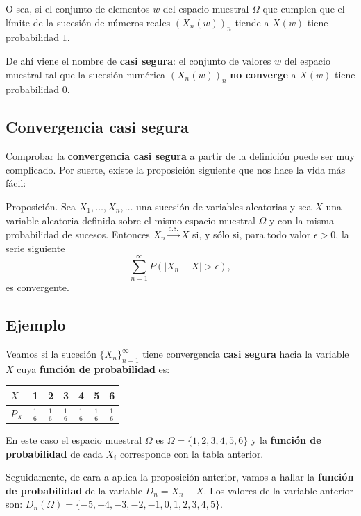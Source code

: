 \documentclass[]{book}
\begin{document}
O sea, si el conjunto de elementos \(w\) del espacio muestral \(\Omega\) que cumplen que el límite de la sucesión de números reales \((X_n(w))_n\) tiende a \(X(w)\) tiene probabilidad \(1\).

De ahí viene el nombre de \textbf{casi segura}: el conjunto de valores \(w\) del espacio muestral tal que la sucesión numérica \((X_n(w))_n\) \textbf{no converge} a \(X(w)\) tiene probabilidad 0.

\hypertarget{convergencia-casi-segura-2}{%
\subsection{Convergencia casi segura}\label{convergencia-casi-segura-2}}

Comprobar la \textbf{convergencia casi segura} a partir de la definición puede ser muy complicado. Por suerte, existe la proposición siguiente que nos hace la vida más fácil:

 Proposición.
Sea \(X_1,\ldots,X_n,\ldots\) una sucesión de variables aleatorias y sea \(X\) una variable aleatoria definida sobre el mismo espacio muestral \(\Omega\) y con la misma probabilidad de sucesos.
Entonces \(X_n\stackrel{c.s.}{\longrightarrow}X\) si, y sólo si, para todo valor \(\epsilon >0\), la serie siguiente
\[
\sum_{n=1}^\infty P(|X_n-X|>\epsilon),
\]
es convergente.

\hypertarget{ejemplo-136}{%
\subsection{Ejemplo}\label{ejemplo-136}}

Veamos si la sucesión \(\{X_n\}_{n=1}^\infty\) tiene convergencia \textbf{casi segura} hacia la variable \(X\) cuya \textbf{función de probabilidad} es:

\begin{longtable}[]{@{}lllllll@{}}
\toprule
\(X\) & 1 & 2 & 3 & 4 & 5 & 6\tabularnewline
\midrule
\endhead
\(P_X\) & \(\frac{1}{6}\) & \(\frac{1}{6}\) & \(\frac{1}{6}\) & \(\frac{1}{6}\) & \(\frac{1}{6}\) & \(\frac{1}{6}\)\tabularnewline
\bottomrule
\end{longtable}

En este caso el espacio muestral \(\Omega\) es \(\Omega=\{1,2,3,4,5,6\}\) y la \textbf{función de probabilidad} de cada \(X_i\) corresponde con la tabla anterior.

Seguidamente, de cara a aplica la proposición anterior, vamos a hallar la \textbf{función de probabilidad} de la variable \(D_n=X_n-X\).
Los valores de la variable anterior son: \(D_n(\Omega)=\{-5,-4,-3,-2,-1,0,1,2,3,4,5\}\).
\end{document}
